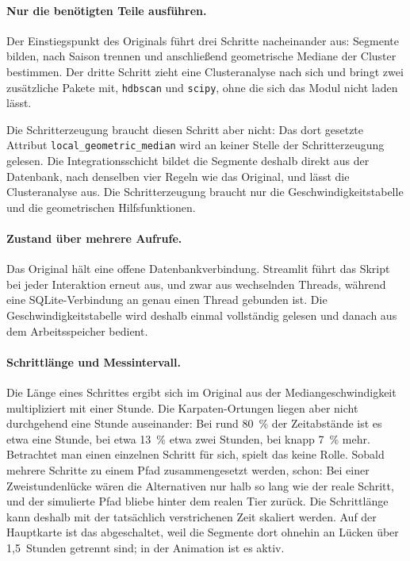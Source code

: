\documentclass[12pt,a4paper]{report}
\begin{document}
  \paragraph{Nur die benötigten Teile ausführen.} Der Einstiegspunkt des
  Originals führt drei Schritte nacheinander aus: Segmente bilden, nach Saison
  trennen und anschließend geometrische Mediane der Cluster bestimmen. Der dritte
  Schritt zieht eine Clusteranalyse nach sich und bringt zwei zusätzliche Pakete mit, \texttt{hdbscan} und \texttt{scipy}, ohne die sich das Modul nicht laden lässt.

Die Schritterzeugung braucht diesen Schritt aber nicht: Das dort gesetzte Attribut   \texttt{local\_geometric\_median} wird an keiner Stelle der Schritterzeugung
  gelesen. Die Integrationsschicht bildet die Segmente deshalb direkt aus der
  Datenbank, nach denselben vier Regeln wie das Original, und lässt die
  Clusteranalyse aus. Die Schritterzeugung braucht nur die
  Geschwindigkeitstabelle und die geometrischen Hilfsfunktionen.

  \paragraph{Zustand über mehrere Aufrufe.} Das Original hält eine offene
  Datenbankverbindung. Streamlit führt das Skript bei jeder Interaktion erneut
  aus, und zwar aus wechselnden Threads, während eine SQLite-Verbindung an
  genau einen Thread gebunden ist. Die Geschwindigkeitstabelle wird deshalb
  einmal vollständig gelesen und danach aus dem Arbeitsspeicher bedient.

  \paragraph{Schrittlänge und Messintervall.} Die Länge eines Schrittes ergibt
  sich im Original aus der Mediangeschwindigkeit multipliziert mit einer Stunde.
  Die Karpaten-Ortungen liegen aber nicht durchgehend eine Stunde auseinander:
  Bei rund 80~\% der Zeitabstände ist es etwa eine Stunde, bei etwa 13~\% etwa zwei Stunden, bei knapp 7~\% mehr. Betrachtet man einen einzelnen
  Schritt für sich, spielt das keine Rolle. Sobald mehrere Schritte zu einem Pfad
  zusammengesetzt werden, schon: Bei einer Zweistundenlücke wären die Alternativen nur halb so lang wie der reale Schritt, und der simulierte Pfad bliebe hinter dem realen Tier zurück. Die Schrittlänge kann deshalb mit der tatsächlich verstrichenen Zeit skaliert
werden. Auf der Hauptkarte ist das abgeschaltet, weil die Segmente dort ohnehin
an Lücken über 1,5~Stunden getrennt sind; in der Animation ist es aktiv.
\end{document}
